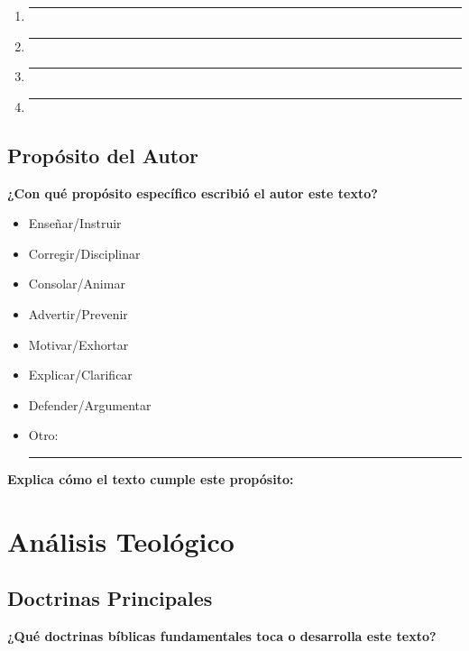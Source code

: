 \documentclass[11pt,a4paper]{article}
\begin{document}
\begin{enumerate}[leftmargin=1cm]
    \item \rule{12cm}{0.4pt}
    \vspace{0.8cm}
    \item \rule{12cm}{0.4pt}
    \vspace{0.8cm}
    \item \rule{12cm}{0.4pt}
    \vspace{0.8cm}
    \item \rule{12cm}{0.4pt}
    \vspace{0.8cm}
\end{enumerate}

\subsection{Propósito del Autor}

\textbf{¿Con qué propósito específico escribió el autor este texto?}
\begin{itemize}[leftmargin=1cm]
    \item[$\square$] Enseñar/Instruir
    \item[$\square$] Corregir/Disciplinar
    \item[$\square$] Consolar/Animar
    \item[$\square$] Advertir/Prevenir
    \item[$\square$] Motivar/Exhortar
    \item[$\square$] Explicar/Clarificar
    \item[$\square$] Defender/Argumentar
    \item[$\square$] Otro: \rule{6cm}{0.4pt}
\end{itemize}

\textbf{Explica cómo el texto cumple este propósito:}
\vspace{3cm}

\section{Análisis Teológico}

\subsection{Doctrinas Principales}

\begin{theologicalbox}
\textbf{¿Qué doctrinas bíblicas fundamentales toca o desarrolla este texto?}
\end{theologicalbox}
\end{document}
